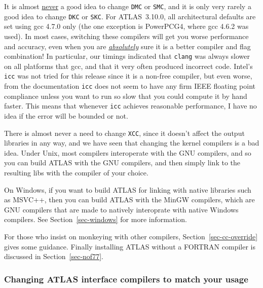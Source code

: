 \documentclass[11pt]{article}
\begin{document}
It is almost \underline{never} a good idea to change {\tt DMC} or {\tt SMC},
and it is only very rarely a good idea to change {\tt DKC} or {\tt SKC}.
For ATLAS~3.10.0, all architectural defaults are set using gcc 4.7.0 only
(the one exception is PowerPCG4, where gcc 4.6.2 was used).  In most
cases, switching these compilers will get you worse performance and accuracy,
even when you are \underline{\em absolutely} sure it is a better compiler
and flag combination!  In particular, our timings indicated that {\tt clang} 
was always slower on all platforms that gcc, and that it very often produced
incorrect code.  Intel's {\tt icc} was not tried for this release since
it is a non-free compiler, but 
even worse, 
from the documentation
{\tt icc} does not seem to have any firm IEEE floating point compliance unless
you want to run so slow that you could compute it by hand faster.  This means
that whenever {\tt icc} achieves reasonable performance, I
have no idea if the error will be bounded or not.  

There is almost never a need to change {\tt XCC}, since it doesn't affect
the output libraries in any way, and we have seen that changing the kernel
compilers is a bad idea.  Under Unix, most compilers interoperate with the
GNU compilers, and so you can build ATLAS with the GNU compilers, and then
simply link to the resulting libs with the compiler of your choice.

On Windows, if you want to build ATLAS for linking with native libraries
such as MSVC++, then you can build ATLAS with the MinGW compilers, which
are GNU compilers that are made to natively interoprate with native Windows
compilers.  See Section~\ref{sec-windows} for more information.

For those who insist on monkeying with
other compilers, Section~\ref{sec-cc-override} gives some guidance.
Finally installing ATLAS without a FORTRAN compiler
is discussed in Section~\ref{sec-nof77}.

\subsubsection{Changing ATLAS interface compilers to match your usage}
\label{sec-cc-iface}
\end{document}
